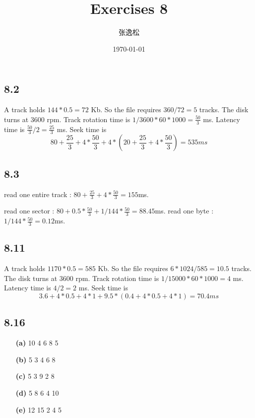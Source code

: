 \documentclass[12pt]{ctexart}
\title{Exercises 8}
\author{张逸松}
\date{\today}
\begin{document}
    \maketitle
    \subsection*{8.2}
    A track holds $144 * 0.5 = 72$ Kb. So the file requires $360 / 72 = 5$ tracks.
    The disk turns at $3600$ rpm. Track rotation time is $1 / 3600 * 60 * 1000 = \frac{50}{3}$ ms. Latency time is $\frac{50}{3} / 2 = \frac{25}{3}$ ms.
    Seek time is $$80 + \frac{25}{3} + 4 * \frac{50}{3} + 4 * (20 + \frac{25}{3} + 4 * \frac{50}{3}) = 535ms$$
    \subsection*{8.3}
    read one entire track : $80 + \frac{25}{3} + 4 * \frac{50}{3} = 155$ms. \par
    read one sector : $80 + 0.5 * \frac{50}{3} + 1 / 144 * \frac{50}{3}= 88.45$ms.
    read one byte : $1 / 144 * \frac{50}{3} = 0.12$ms.
    \subsection*{8.11}
    A track holds $1170 * 0.5 = 585$ Kb. So the file requires $6 * 1024 / 585 = 10.5$ tracks.
    The disk turns at $3600$ rpm. Track rotation time is $1 / 15000 * 60 * 1000 = 4$ ms. Latency time is $4 / 2 = 2$ ms.
    Seek time is $$3.6 + 4 * 0.5 + 4 * 1 + 9.5 * (0.4 + 4 * 0.5 + 4 * 1) = 70.4ms$$
    \subsection*{8.16}
    \begin{itemize}
        \item [\textbf{(a)}] 10 4 6 8 5
        \item [\textbf{(b)}] 5 3 4 6 8
        \item [\textbf{(c)}] 5 3 9 2 8
        \item [\textbf{(d)}] 5 8 6 4 10
        \item [\textbf{(e)}] 12 15 2 4 5
    \end{itemize}
\end{document}
